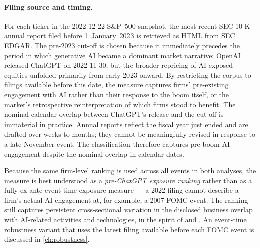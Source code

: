 \paragraph{Filing source and timing.} For each ticker in the 2022-12-22 S\&P~500 snapshot, the most recent SEC 10-K annual report filed before 1~January~2023 is retrieved as HTML from SEC EDGAR. The pre-2023 cut-off is chosen because it immediately precedes the period in which generative AI became a dominant market narrative: OpenAI released ChatGPT on 2022-11-30, but the broader repricing of AI-exposed equities unfolded primarily from early 2023 onward. By restricting the corpus to filings available before this date, the measure captures firms' pre-existing engagement with AI rather than their response to the boom itself, or the market's retrospective reinterpretation of which firms stood to benefit. The nominal calendar overlap between ChatGPT's release and the cut-off is immaterial in practice. Annual reports reflect the fiscal year just ended and are drafted over weeks to months; they cannot be meaningfully revised in response to a late-November event. The classification therefore captures pre-boom AI engagement despite the nominal overlap in calendar dates.

Because the same firm-level ranking is used across all events in both analyses, the measure is best understood as a \emph{pre-ChatGPT exposure ranking} rather than as a fully ex-ante event-time exposure measure --- a 2022 filing cannot describe a firm's actual AI engagement at, for example, a 2007 FOMC event. The ranking still captures persistent cross-sectional variation in the disclosed business overlap with AI-related activities and technologies, in the spirit of \citet{davisHansenSeminarioAmez2020} and \citet{eisfeldtSchubertZhangTaska2023}. An event-time robustness variant that uses the latest filing available before each FOMC event is discussed in \cref{ch:robustness}.

